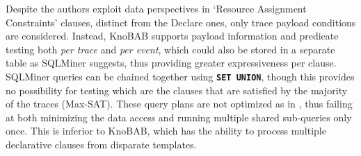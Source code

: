 {Despite the authors} exploit %
{data} perspectives in `Resource Assignment Constraints' clauses, distinct from the Declare ones, %
	only trace payload conditions are considered. Instead, KnoBAB supports payload information and predicate testing {both \emph{per trace}} and \emph{per event}, which could also be stored in a separate table as SQLMiner suggests, thus providing greater expressiveness per clause.
%
SQLMiner queries can be chained together using \texttt{\textbf{SET UNION}}, though this provides no possibility for testing which are the clauses that are satisfied by the majority of the traces (Max-SAT). These query plans are not optimized as in \cite{BellatrecheKB21}, thus failing at both minimizing the data access
and running multiple shared sub-queries only once.
This is inferior to KnoBAB, which has the ability to process multiple 
declarative clauses from disparate templates. %
